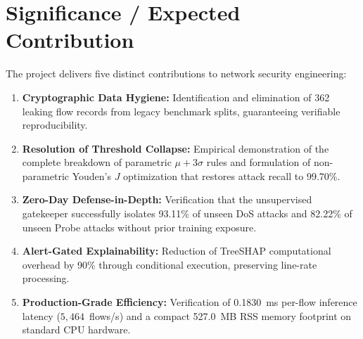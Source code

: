 \documentclass[12pt,a4paper]{report}
\begin{document}
\section{Significance / Expected Contribution}
The project delivers five distinct contributions to network security engineering:
\begin{enumerate}
    \item \textbf{Cryptographic Data Hygiene:} Identification and elimination of 362 leaking flow records from legacy benchmark splits, guaranteeing verifiable reproducibility.
    \item \textbf{Resolution of Threshold Collapse:} Empirical demonstration of the complete breakdown of parametric $\mu + 3\sigma$ rules and formulation of non-parametric Youden's $J$ optimization that restores attack recall to 99.70\%.
    \item \textbf{Zero-Day Defense-in-Depth:} Verification that the unsupervised gatekeeper successfully isolates 93.11\% of unseen DoS attacks and 82.22\% of unseen Probe attacks without prior training exposure.
    \item \textbf{Alert-Gated Explainability:} Reduction of TreeSHAP computational overhead by 90\% through conditional execution, preserving line-rate processing.
    \item \textbf{Production-Grade Efficiency:} Verification of 0.1830~ms per-flow inference latency ($5{,}464$~flows/s) and a compact 527.0~MB RSS memory footprint on standard CPU hardware.
\end{enumerate}
\end{document}
